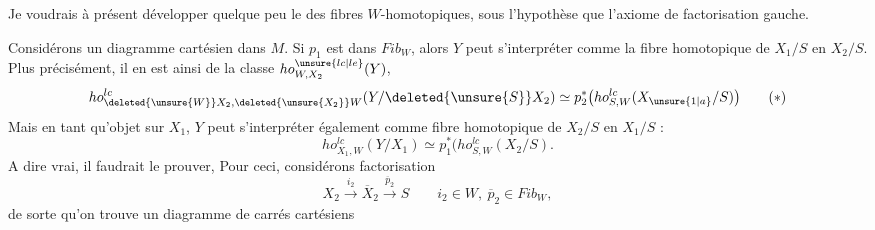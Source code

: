 
Je voudrais à présent développer quelque peu le  des fibres $W$-homotopiques, sous l'hypothèse  que  l'axiome de factorisation gauche.

Considérons un diagramme cartésien
dans $M$. Si $p_1$ est dans $Fib_W$, alors $Y$   peut s'interpréter comme la fibre homotopique de $X_1/S$ en $X_2/S$. Plus précisément, il en est ainsi de la classe $ho^{\unsure{lc|le}}_{W,X_2}(Y)$,
\[
 ho^{lc}_{\deleted{\unsure{W}}X_2,\deleted{\unsure{X_2}}W}
 (Y/\deleted{\unsure{S}}X_2)\simeq p_2^*\bigl(ho^{lc}_{S,W}(X_{\unsure{1|a}}/S)\bigr)
 \tag*{$(*)$}
\]
Mais en tant qu'objet sur $X_1$, $Y$ peut s'interpréter également comme fibre homotopique de $X_2/S$ en $X_1/S$ :
\[
 ho^{lc}_{X_1,W}(Y/X_1)\simeq p_1^*\bigl(ho^{lc}_{S,W}(X_2/S).
 \tag*{$(**)$}
\]
A dire vrai, il faudrait le prouver, Pour ceci, considérons  factorisation
\[
 X_2\xrightarrow{i_2}\overline X_2\xrightarrow{\overline p_2}S
 \qquad i_2\in W,\ \overline p_2\in Fib_W,
\]
de sorte qu'on trouve un diagramme de carrés cartésiens

